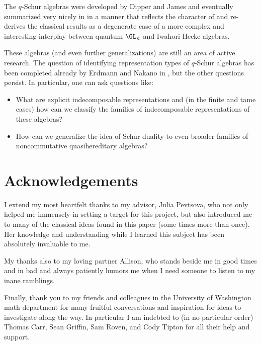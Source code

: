 \documentclass[12pt]{article}
\begin{document}
The $q$-Schur algebras were developed by Dipper and James and eventually summarized very nicely in \cite{donkin-q-schur} in a manner that
reflects the character of \cite{green} and re-derives the classical results as a degenerate case of a more complex and 
interesting interplay between quantum $\GL_n$ and Iwahori-Hecke algebras.

These algebras (and even further generalizations) are still an area of active research. The question of identifying representation 
types of $q$-Schur algebras has been completed already by Erdmann and Nakano in \cite{erdmann-nakano}, 
but the other questions persist. In particular, one can ask questions like:
\begin{itemize}
	\item What are explicit indecomposable representations and (in the finite and tame cases) how can we classify the families of indecomposable representations of these algebras?
	\item How can we generalize the idea of Schur duality to even broader families of noncommutative quasihereditary algebras?
\end{itemize}



\newpage
\section*{Acknowledgements}
\label{sec:ack}
I extend my most heartfelt thanks to my advisor, Julia Pevtsova, who not only helped me immensely in setting a target 
for this project, but also introduced me to many of the classical ideas found in this paper (some times more than once). 
Her knowledge and understanding while I learned this subject has been absolutely invaluable to me.

My thanks also to my loving partner Allison, who stands beside me in good times and in bad and always patiently humors me when 
I need someone to listen to my inane ramblings.

Finally, thank you to my friends and colleagues in the University of Washington math department for many fruitful conversations 
and inspiration for ideas to investigate along the way. In particular I am indebted to (in no particular order) Thomas Carr, Sean Griffin, Sam Roven, and Cody Tipton
for all their help and support.

\newpage

\printbibliography
{}
\end{document}
